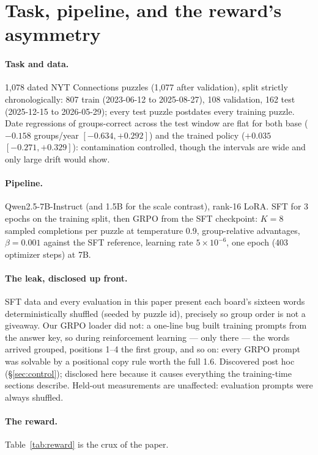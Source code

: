 \documentclass{article}
\begin{document}
\section{Task, pipeline, and the reward's asymmetry}
\label{sec:setup}

\paragraph{Task and data.} 1{,}078 dated NYT Connections puzzles (1{,}077
after validation), split strictly chronologically: 807 train (2023-06-12 to
2025-08-27), 108 validation, 162 test (2025-12-15 to 2026-05-29); every
test puzzle postdates every training puzzle. Date regressions of
groups-correct across the test window are flat for both base ($-0.158$
groups/year $[-0.634, +0.292]$) and the trained policy ($+0.035$ $[-0.271,
+0.329]$): contamination controlled, though the intervals are wide and only
large drift would show.

\paragraph{Pipeline.} Qwen2.5-7B-Instruct (and 1.5B for the scale contrast),
rank-16 LoRA. SFT for 3 epochs on the training split, then GRPO
\citep{deepseekmath} from the SFT checkpoint: $K=8$ sampled completions per
puzzle at temperature 0.9, group-relative advantages, $\beta=0.001$ against
the SFT reference, learning rate $5\times10^{-6}$, one epoch (403 optimizer
steps) at 7B.

\paragraph{The leak, disclosed up front.} SFT data and every evaluation in
this paper present each board's sixteen words deterministically shuffled
(seeded by puzzle id), precisely so group order is not a giveaway. Our GRPO
loader did not: a one-line bug built training prompts from the answer key,
so during reinforcement learning --- only there --- the words arrived
grouped, positions 1--4 the first group, and so on: every GRPO prompt was
solvable by a positional copy rule worth the full 1.6. Discovered post
hoc (\S\ref{sec:control}); disclosed here because it causes everything
the training-time sections describe. Held-out
measurements are unaffected: evaluation prompts were always shuffled.

\paragraph{The reward.} Table~\ref{tab:reward} is the crux of the paper.
\end{document}
